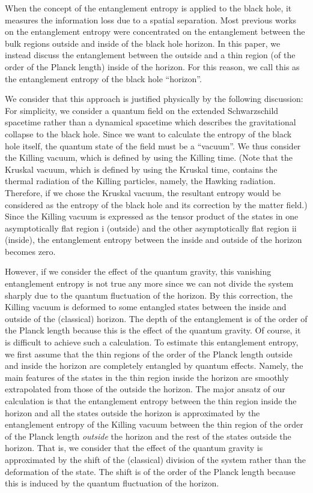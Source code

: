 When the concept of the entanglement entropy
is applied to the black hole,
it measures the information loss due to a spatial separation.
Most previous works on the entanglement entropy were
concentrated on the entanglement between the bulk regions outside
and inside of the black hole horizon.
In this paper, we instead discuss the entanglement
between the outside and a thin region
(of the order of the Planck length) inside of the horizon.
For this reason, we call this as
the entanglement entropy of the black hole ``horizon''.

We consider that this approach is justified physically
by the following discussion:
For simplicity,
we consider a quantum field on the extended Schwarzschild
spacetime rather than a dynamical spacetime which describes
the gravitational collapse to the black hole.
Since we want to calculate
the entropy of the black hole itself,
the quantum state of the field must be a ``vacuum''.
We thus consider the Killing vacuum,
which is defined by using the Killing time.
(Note that the Kruskal vacuum,
which is defined by using the Kruskal time,
contains the thermal radiation of the Killing particles,
namely, the Hawking radiation.
Therefore, if we chose the Kruskal vacuum,
the resultant entropy would be considered as the
entropy of the black hole and its correction by the matter field.)
Since
the Killing vacuum is expressed as the tensor product of
the states in one asymptotically flat region \Rn{1} (outside)
and the other asymptotically flat region \Rn{2} (inside),
the entanglement entropy between the inside and outside
of the horizon becomes zero.

However, if we consider the effect of the quantum gravity,
this vanishing entanglement entropy is not true any more
since we can not divide the system sharply due to
the quantum fluctuation of the horizon.
By this correction, the Killing vacuum is deformed
to some entangled states between the inside and outside
of the (classical) horizon.
The depth of the entanglement is of the order of the
Planck length because this is the effect of the quantum gravity.
Of course, it is difficult to achieve such a calculation.
To estimate this entanglement entropy,
we first assume that the thin regions 
of the order of the Planck length outside and inside the horizon
are completely entangled by quantum effects.
Namely, the main features of the states in the thin region
inside the horizon are smoothly extrapolated from
those of the outside the horizon.
The major ansatz of our calculation is that
the entanglement entropy between the thin region
inside the horizon and all the states outside the horizon
is approximated by the entanglement entropy
of the Killing vacuum between
the thin region of the order of the Planck length
{\em outside} the horizon and the rest of
the states outside the horizon.
That is, we consider that the effect of the quantum gravity
is approximated by the shift of
the (classical) division of the system
rather than the deformation of the state.
The shift is of the order of the Planck length
because this is induced by
the quantum fluctuation of the horizon.

